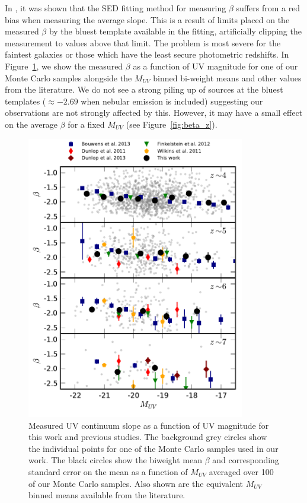 In \citet{2013MNRAS.429.2456R}, it was shown that the SED fitting method for measuring $\beta$ suffers from a red bias when measuring the average slope. This is a result of limits placed on the measured $\beta$ by the bluest template available in the fitting, artificially clipping the measurement to values above that limit. The problem is most severe for the faintest galaxies or those which have the least secure photometric redshifts. In Figure~\ref{fig:beta_muv}, we show the measured $\beta$ as a function of UV magnitude for one of our Monte Carlo samples alongside the $M_{UV}$ binned bi-weight means and other values from the literature. We do not see a strong piling up of sources at the bluest templates ($\approx -2.69$ when nebular emission is included) suggesting our observations are not strongly affected by this. However, it may have a small effect on the average $\beta$ for a fixed $M_{UV}$ (see Figure~\ref{fig:beta_z}).

\begin{figure}
\centering
\includegraphics[width=0.85\textwidth]{plots/figB2.pdf}
\caption[Measured UV continuum slope as a function of UV magnitude for this work and previous studies. ]{Measured UV continuum slope as a function of UV magnitude for this work and previous studies. The background grey circles show the individual points for one of the Monte Carlo samples used in our work. The black circles show the biweight mean $\beta$ and corresponding standard error on the mean as a function of $M_{UV}$ averaged over 100 of our Monte Carlo samples. Also shown are the equivalent $M_{UV}$ binned means available from the literature.}
\label{fig:beta_muv}
\end{figure}

